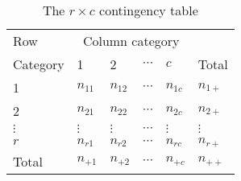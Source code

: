 \begin{table}[htb]
\caption[The r by c contingency table]{The $r \times c$ contingency table}
\label{tab:rbyc}
\vspace{1ex}
\begin{center}
\begin{tabular}{l|llll|l}
\hline
Row      & \multicolumn{4}{c|}{Column category}      &          \\
Category &   1      &   2      & $\cdots$  &  $c$    & Total    \\
\hline
   1     & $n_{11}$ & $n_{12}$ & $\cdots$ & $n_{1c}$ & $n_{1+}$ \\
   2     & $n_{21}$ & $n_{22}$ & $\cdots$ & $n_{2c}$ & $n_{2+}$ \\
$\vdots$ & $\vdots$ & $\vdots$ & $\cdots$ & $\vdots$ & $\vdots$ \\
   $r$   & $n_{r1}$ & $n_{r2}$ & $\cdots$ & $n_{rc}$ & $n_{r+}$   \\  
\hline
Total    & $n_{+1}$ & $n_{+2}$ & $\cdots$ & $n_{+c}$ & $n_{++}$   \\
\hline
\end{tabular}
\end{center}
\end{table}
